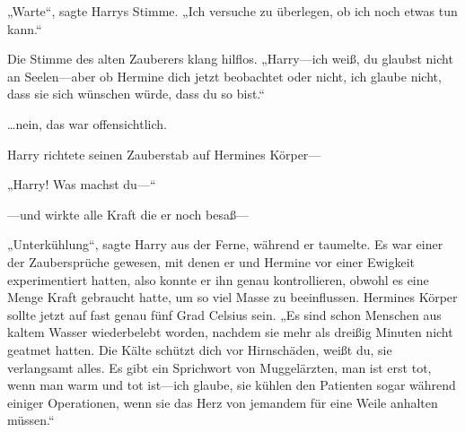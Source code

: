 „Warte“, sagte Harrys Stimme. „Ich versuche zu überlegen, ob ich noch etwas tun kann.“

Die Stimme des alten Zauberers klang hilflos. „Harry—ich weiß, du glaubst nicht an Seelen—aber ob Hermine dich jetzt beobachtet oder nicht, ich glaube nicht, dass sie sich wünschen würde, dass du so bist.“

…nein, das war offensichtlich.

Harry richtete seinen Zauberstab auf Hermines Körper—

„Harry! Was machst du—“

—und wirkte alle Kraft die er noch besaß—



„Unterkühlung“, sagte Harry aus der Ferne, während er taumelte. Es war einer der Zaubersprüche gewesen, mit denen er und Hermine vor einer Ewigkeit experimentiert hatten, also konnte er ihn genau kontrollieren, obwohl es eine Menge Kraft gebraucht hatte, um so viel Masse zu beeinflussen. Hermines Körper sollte jetzt auf fast genau fünf Grad Celsius sein. „Es sind schon Menschen aus kaltem Wasser wiederbelebt worden, nachdem sie mehr als dreißig Minuten nicht geatmet hatten. Die Kälte schützt dich vor Hirnschäden, weißt du, sie verlangsamt alles. Es gibt ein Sprichwort von Muggelärzten, man ist erst tot, wenn man warm und tot ist—ich glaube, sie kühlen den Patienten sogar während einiger Operationen, wenn sie das Herz von jemandem für eine Weile anhalten müssen.“

